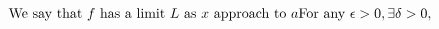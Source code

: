 \documentclass[preview]{standalone}
\begin{document}
\begin{align*}
{\text{We say that } f \text{ has a limit } L \text{ as } x \text{ approach to } a} \centering\text{For any }\epsilon > 0, \exists \delta > 0,
\end{align*}
\end{document}
